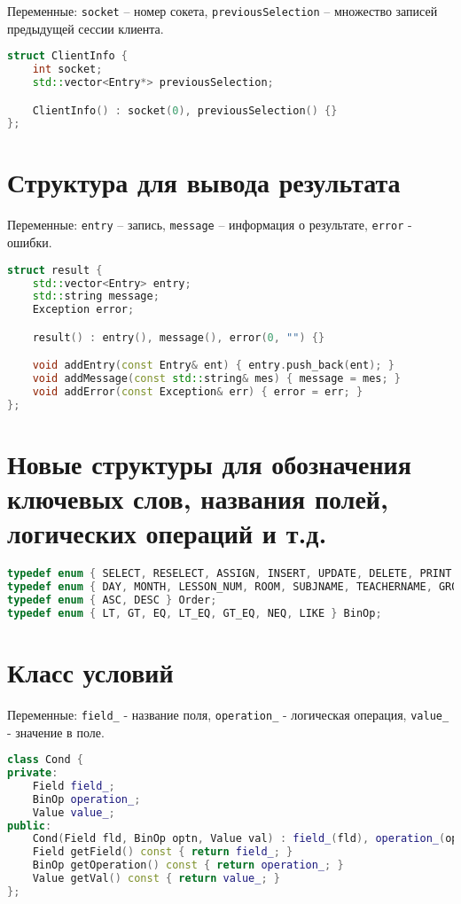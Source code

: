\documentclass{article}
\begin{document}
Переменные: \texttt{socket} – номер сокета, \texttt{previousSelection} – множество записей предыдущей сессии клиента.

\begin{lstlisting}[language=C++]
struct ClientInfo {
    int socket;
    std::vector<Entry*> previousSelection;

    ClientInfo() : socket(0), previousSelection() {}
};
\end{lstlisting}

\section*{Структура для вывода результата}

Переменные: \texttt{entry} – запись, \texttt{message} – информация о результате, \texttt{error} - ошибки.
\begin{lstlisting}[language=C++]
struct result {
    std::vector<Entry> entry;
    std::string message;
    Exception error;

    result() : entry(), message(), error(0, "") {}

    void addEntry(const Entry& ent) { entry.push_back(ent); }
    void addMessage(const std::string& mes) { message = mes; }
    void addError(const Exception& err) { error = err; }
};
\end{lstlisting}

\section*{Новые структуры для обозначения ключевых слов, названия полей, логических операций и т.д.}

\begin{lstlisting}[language=C++]
typedef enum { SELECT, RESELECT, ASSIGN, INSERT, UPDATE, DELETE, PRINT } ComType;
typedef enum { DAY, MONTH, LESSON_NUM, ROOM, SUBJNAME, TEACHERNAME, GROUP, NONE_FIELD } Field;
typedef enum { ASC, DESC } Order;
typedef enum { LT, GT, EQ, LT_EQ, GT_EQ, NEQ, LIKE } BinOp;
\end{lstlisting}

\section*{Класс условий}

Переменные: \texttt{field\_} - название поля, \texttt{operation\_} - логическая операция, \texttt{value\_} - значение в поле.

\begin{lstlisting}[language=C++]
class Cond {
private:
    Field field_;
    BinOp operation_;
    Value value_;
public:
    Cond(Field fld, BinOp optn, Value val) : field_(fld), operation_(optn), value_(val) {}
    Field getField() const { return field_; }
    BinOp getOperation() const { return operation_; }
    Value getVal() const { return value_; }
};
\end{lstlisting}
\end{document}
